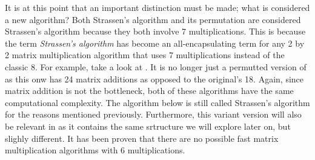     It is at this point that an important distinction must be made; what is
    considered a new algorithm? Both Strassen's algorithm and its permutation
    are considered Strassen's algorithm because they both involve 7
    multiplications. This is because the term \textit{Strassen's algorithm} has
    become an all-encapsulating term for any 2 by 2 matrix multiplication
    algorithm that uses 7 multiplications instead of the classic 8. For example,
    take a look at . It is no longer just a permutted
    version of  as this onw has 24 matrix additions as
    opposed to the original's 18. Again, since matrix addition is not the
    bottleneck, both of these algorithms have the same computational complexity.
    The algorithm below is still called Strassen's algorithm for the reasons
    mentioned previously. Furthermore, this variant version will also be
    relevant in  as it contains the same srtructure
    we will explore later on, but slighly different. It has been proven that
    there are no possible fast matrix multiplication algorithms with 6
    multiplications. 

